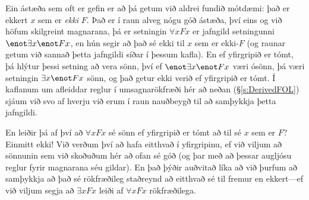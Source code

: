 Ein ástæða sem oft er gefin er að þá getum við aldrei fundið mótdæmi: það er ekkert $x$ sem er \emph{ekki} $F$. Það er í raun alveg nógu góð ástæða, því eins og við höfum skilgreint magnarana, þá er setningin $\forall x Fx$ er jafngild setningunni $\enot \exists x \enot Fx$, en hún segir að það sé ekki til $x$ sem er ekki-$F$ (og raunar getum við sannað þetta jafngildi síðar í þessum kafla). En ef yfirgripið er tómt, þá hlýtur þessi setning að vera sönn, því ef $\enot \exists x \enot Fx$ væri ósönn, þá væri setningin $\exists x \enot Fx$ sönn, og það getur ekki verið ef yfirgripið er tómt. Í kaflanum um afleiddar reglur í umsagnarökfræði hér að neðan (\S\ref{s:DerivedFOL}) sjáum við svo af hverju við erum í raun nauðbeygð til að samþykkja þetta jafngildi.



En leiðir þá af því að $\forall x Fx$ sé sönn ef yfirgripið er tómt að til sé $x$ sem er $F$? Einmitt ekki! Við verðum því að hafa eitthvað í yfirgripinu, ef við viljum að sönnunin sem við skoðuðum hér að ofan sé góð (og þar með að þessar augljósu reglur fyrir magnarana séu gildar). En það þýðir auðvitað líka að við þurfum að samþykkja að það sé rökfræðileg staðreynd að eitthvað sé til fremur en ekkert---ef við viljum segja að $\exists x Fx$ leiði af $\forall x Fx$ rökfræðilega. 

